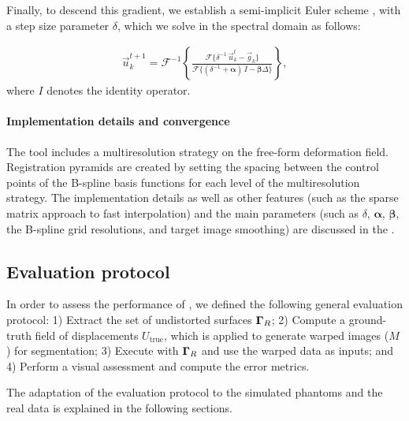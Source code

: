 Finally, to descend this gradient, we establish a semi-implicit Euler scheme
  ,
  with a step size parameter $\delta$, which we solve in the spectral domain as follows:

  \begin{align}
  \vec{u}_k^{t+1} = \mathcal{F}^{-1}\left\{ \frac{\mathcal{F}\{\delta^{-1} \, \vec{u}_k^t - \vec{g}_k\} }
                    {\mathcal{F}\{(\delta^{-1} + \boldsymbol{\alpha})\, I - \boldsymbol{\beta}\Delta\}} \right\},
  \label{eq:regseg-update_equation}
  \end{align}
  where $I$ denotes the identity operator.


\paragraph*{Implementation details and convergence}%
\label{sec:regseg-conv_report}
The \regseg{} tool includes a multiresolution strategy on the free-form deformation field.
Registration pyramids are created by setting the spacing between the control points of the B-spline basis
  functions for each level of the multiresolution strategy.
The implementation details as well as other features (such as the sparse matrix approach
  to fast interpolation) and the main parameters
  (such as $\delta$, $\boldsymbol{\alpha}$, $\boldsymbol{\beta}$, the B-spline grid resolutions,
  and target image smoothing) are discussed in the .

\subsection{Evaluation protocol}\label{sec:regseg-evaluation_protocol}
In order to assess the performance of \regseg{}, we defined the following general
  evaluation protocol:
1) Extract the set of undistorted surfaces $\boldsymbol{\Gamma}_R$;
2) Compute a ground-truth field of displacements $U_\text{true}$, which is applied to
  generate warped images ($M$) for segmentation;
3) Execute \regseg{} with $\boldsymbol{\Gamma}_R$ and use the warped data as inputs; and
4) Perform a visual assessment and compute the error metrics.

The adaptation of the evaluation protocol to the simulated phantoms and the real data is
  explained in the following sections.

